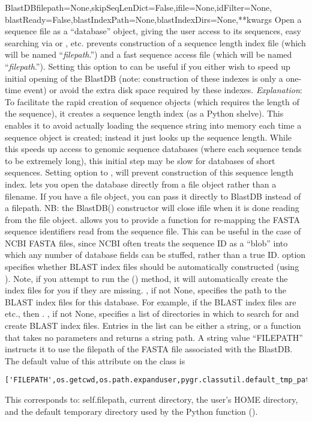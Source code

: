 \documentclass{howto}
\begin{document}
\begin{funcdesc}{BlastDB}{filepath=None,skipSeqLenDict=False,ifile=None,idFilter=None,
                 blastReady=False,blastIndexPath=None,blastIndexDirs=None,**kwargs}
  Open a sequence file as a ``database'' object, giving the user access to its sequences,
  easy searching via  or , etc.
   prevents construction of a sequence length index file 
  (which will be named ``{\em filepath}.'') and a fast
  sequence access file (which will be named ``{\em filepath}.'').
  Setting this option to  can be useful if you either wish to
  speed up initial opening of the BlastDB (note: construction of these indexes is
  only a one-time event) or avoid the extra disk space required by these indexes.
  {\em Explanation}: To facilitate the rapid creation of sequence objects (which requires the length of the sequence), it creates a sequence length index (as a Python shelve).  This enables it to avoid actually loading the sequence string into memory each time a sequence object is created; instead it just looks up the sequence length.  While this speeds up access to genomic sequence databases (where each sequence tends to be extremely long), this initial step may be slow for databases of short sequences.  Setting  option to , will prevent construction of this sequence length index.
   lets you open the database directly from a file object rather
  than a filename.  If you have a file object, you can pass it directly to BlastDB instead of a filepath.  NB: the BlastDB() constructor will close ifile when it is done reading from the file object.
   allows you to provide a function for re-mapping the FASTA sequence
  identifiers read from the sequence file.  This can be useful in the case of
  NCBI FASTA files, since NCBI often treats the sequence ID as a ``blob'' into
  which any number of database fields can be stuffed, rather than a true ID.
   option specifies whether BLAST index files should be automatically
  constructed (using ).  Note, if you attempt to run the ()
  method, it will automatically create the index files for you if they are missing.
  , if not None, specifies the path to the BLAST index
  files for this database.  For example, if the BLAST index files are
   etc., then .
  , if not None, specifies a list of directories in which
  to search for and create BLAST index files.  Entries in the list can be
  either a string, or a function that takes no parameters and returns 
  a string path.  A string value ``FILEPATH'' instructs it to use the 
  filepath of the FASTA file associated with the BlastDB.
  The default value of this attribute on the  class is 
\begin{verbatim}
['FILEPATH',os.getcwd,os.path.expanduser,pygr.classutil.default_tmp_path]
\end{verbatim}
This corresponds to: self.filepath, current directory, the user's HOME
directory, and the default temporary directory used by the Python 
function ().
\end{funcdesc}
\end{document}
